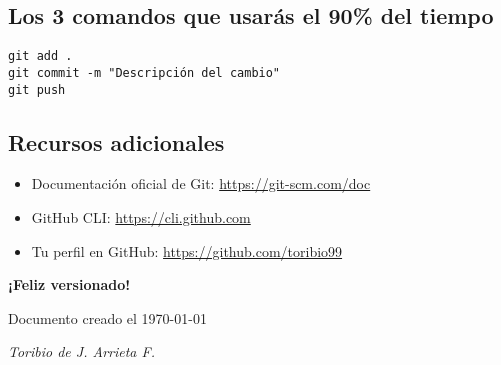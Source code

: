 \documentclass[12pt,a4paper]{article}
\begin{document}
\subsection{Los 3 comandos que usarás el 90\% del tiempo}

\begin{lstlisting}[style=bashstyle]
git add .
git commit -m "Descripción del cambio"
git push
\end{lstlisting}

\subsection{Recursos adicionales}

\begin{itemize}
  \item Documentación oficial de Git: \url{https://git-scm.com/doc}
  \item GitHub CLI: \url{https://cli.github.com}
  \item Tu perfil en GitHub: \url{https://github.com/toribio99}
\end{itemize}

\vspace{1cm}
\begin{center}
\Large\textbf{¡Feliz versionado!}

\medskip
\normalsize
Documento creado el \today

\smallskip
\textit{Toribio de J. Arrieta F.}
\end{center}
\end{document}
